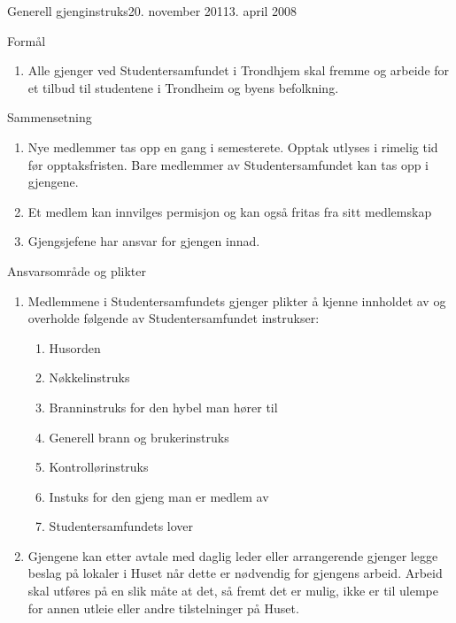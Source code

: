 \begin{instruks}{Generell gjenginstruks}{20. november 2011}{3. april 2008}
    
    \begin{instruksledd}{Formål}
        \begin{enumerate}
            \item Alle gjenger ved Studentersamfundet i Trondhjem skal fremme og arbeide for et
                  tilbud til studentene i Trondheim og byens befolkning.
        \end{enumerate}
    \end{instruksledd}


    \begin{instruksledd}{Sammensetning}
        \begin{enumerate}
            \item Nye medlemmer tas opp en gang i semesterete. Opptak utlyses i rimelig
                tid før opptaksfristen. Bare medlemmer av Studentersamfundet kan tas opp i
                gjengene.
            \item Et medlem kan innvilges permisjon og kan også fritas fra sitt medlemskap
            \item Gjengsjefene har ansvar for gjengen innad.
        \end{enumerate}

    \end{instruksledd}


    \begin{instruksledd}{Ansvarsområde og plikter}
        \begin{enumerate}
            \item Medlemmene i Studentersamfundets gjenger plikter å kjenne innholdet av
                og overholde følgende av Studentersamfundet instrukser:
                \begin{enumerate}
                    \item Husorden
                    \item Nøkkelinstruks
                    \item Branninstruks for den hybel man hører til
                    \item Generell brann og brukerinstruks
                    \item Kontrollørinstruks
                    \item Instuks for den gjeng man er medlem av
                    \item Studentersamfundets lover
                \end{enumerate}
            \item Gjengene kan etter avtale med daglig leder eller arrangerende gjenger
                legge beslag på lokaler i Huset når dette er nødvendig for gjengens
                arbeid. Arbeid skal utføres på en slik måte at det, så fremt det er mulig,
                ikke er til ulempe for annen utleie eller andre tilstelninger på Huset.
        \end{enumerate}


\end{instruksledd}
\end{instruks}
